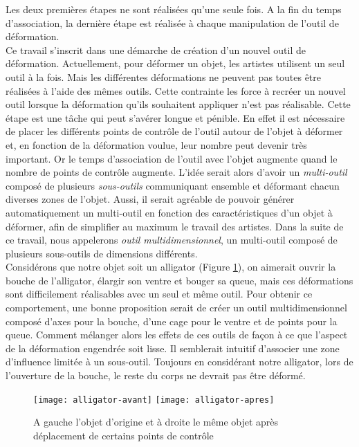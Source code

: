 Les deux premières étapes ne sont réalisées qu'une seule fois. A la fin du temps
d'association, la dernière étape est réalisée à chaque manipulation de l'outil
de déformation. \\

Ce travail s'inscrit dans une démarche de création d'un nouvel outil de
déformation. Actuellement, pour déformer un objet, les artistes utilisent un
seul outil à la fois. Mais les différentes déformations ne peuvent pas toutes
être réalisées à l'aide des mêmes outils. Cette contrainte les force à recréer
un nouvel outil lorsque la déformation qu'ils souhaitent appliquer n'est pas
réalisable. Cette étape est une tâche qui peut s'avérer longue et pénible. En
effet il est nécessaire de placer les différents points de contrôle de l'outil
autour de l'objet à déformer et, en fonction de la déformation voulue, leur
nombre peut devenir très important. Or le temps d'association de l'outil avec
l'objet augmente quand le nombre de points de contrôle augmente. L'idée serait
alors d'avoir un \textit {multi-outil} composé de plusieurs \textit{sous-outils}
communiquant ensemble et déformant chacun diverses zones de l'objet. Aussi, il
serait agréable de pouvoir générer automatiquement un multi-outil en fonction
des caractéristiques d'un objet à déformer, afin de simplifier au maximum le
travail des artistes. Dans la suite de ce travail, nous appelerons \textit{outil
multidimensionnel}, un multi-outil composé de plusieurs sous-outils de
dimensions différents. \\

Considérons que notre objet soit un alligator (Figure \ref{INTall}), on aimerait
ouvrir la bouche de l'alligator, élargir son ventre et bouger sa queue, mais ces
déformations sont difficilement réalisables avec un seul et même outil. Pour
obtenir ce comportement, une bonne proposition serait de créer un outil
multidimensionnel composé d'axes pour la bouche, d'une cage pour le ventre et de
points pour la queue. Comment mélanger alors les effets de ces outils de façon à
ce que l'aspect de la déformation engendrée soit lisse. Il semblerait intuitif
d'associer une zone d'influence limitée à un sous-outil. Toujours en considérant
notre alligator, lors de l'ouverture de la bouche, le reste du corps ne devrait
pas être déformé. \\

\begin{figure}[ht]
  \texttt{[image: alligator-avant]}
  \texttt{[image: alligator-apres]}
  \caption{A gauche l'objet d'origine et à droite le même objet après
    déplacement de certains points de contrôle}
  \label{INTall}
\end{figure}

